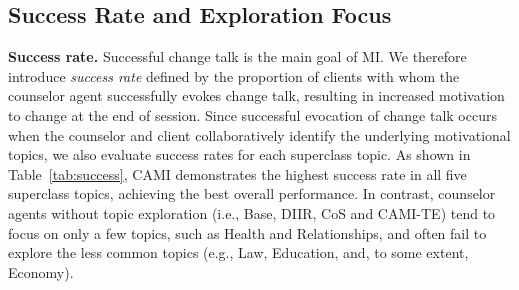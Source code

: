 \begin{comment}
As shown in Table~\ref{tab:client assessment}, CAMI achieves higher client assessment compared to other baselines. However, compared to the high-quality human counseling sessions, there is still significant room for improvement. Furthermore, the performance of some baselines falls below that of low-quality sessions. This indicates that while LLM-based counselor agents may demonstrate MI technique competence, there are other aspects that need to be addressed to further improve the client experience.
\end{comment}

\subsection{Success Rate and Exploration Focus}
\label{sec:topic exploration}

\textbf{Success rate.} Successful change talk is the main goal of MI. We therefore introduce \textit{success rate} defined by the proportion of clients with whom the counselor agent successfully evokes change talk, resulting in increased motivation to change at the end of session. Since successful evocation of change talk occurs when the counselor and client collaboratively identify the underlying motivational topics, we also evaluate success rates for each superclass topic. As shown in Table~\ref{tab:success}, CAMI demonstrates the highest success rate in all five superclass topics, achieving the best overall performance. In contrast, counselor agents without topic exploration (i.e., Base, DIIR, CoS and CAMI-TE) tend to focus on only a few topics, such as Health and Relationships, and often fail to explore the less common topics (e.g., Law, Education, and, to some extent, Economy). %

